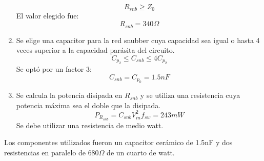 \begin{enumerate}
$$ R_{snb} \ge Z_{0} $$
El valor elegido fue:
    $$ R_{snb}=340\Omega $$
    \item Se elige una capacitor para la red snubber cuya capacidad sea igual o hasta 4 veces superior a la capacidad parásita del circuito. 
    $$ C_{p_2}\leq C_{snb}\leq 4C_{p_2} $$
    Se optó por un factor 3:
    $$ C_{snb}=C_{p_{0}}=1.5nF $$
    \item Se calcula la potencia disipada en $R_{snb}$ y se utiliza una resistencia cuya potencia máxima sea el doble que la disipada.
    $$ P_{R_{snb}}=C_{snb}V_{in}^2f_{sw}= 243mW $$  
    Se debe utilizar una resistencia de medio watt.
\end{enumerate}

Los componentes utilizados fueron un capacitor cerámico de 1.5nF y dos resistencias en paralelo de $680\Omega$ de un cuarto de watt. 